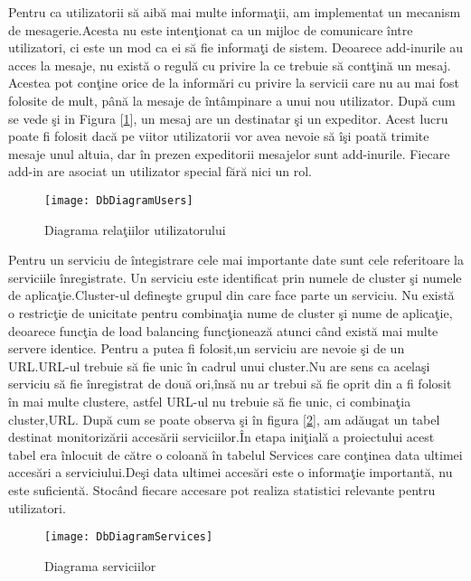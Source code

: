 \documentclass[a4paper,12pt]{report}
\let\oldref\ref
\renewcommand{\ref}[1]{[\oldref{#1}]}
\begin{document}
Pentru ca utilizatorii s\u a aib\u a mai multe informa\c tii, am implementat un mecanism de mesagerie.Acesta nu este 
inten\c tionat ca un mijloc de comunicare \^intre utilizatori, ci este un mod ca ei s\u a fie informa\c ti de sistem.
Deoarece add-inurile au acces la mesaje, nu exist\u a o regul\u a cu privire la ce trebuie s\u a cont\c tin\u a un mesaj.
Acestea pot con\c tine orice de la inform\u ari cu privire la servicii care nu au mai fost folosite de mult, p\^an\u a
la mesaje de \^int\^ampinare a unui nou utilizator. Dup\u a cum se vede \c si in Figura \ref{fig:DbUser}, un mesaj 
are un destinatar \c si un expeditor. Acest lucru poate fi folosit dac\u a pe viitor utilizatorii vor avea nevoie s\u a
 \^i\c si poat\u a trimite mesaje unul altuia, dar \^in prezen expeditorii mesajelor sunt add-inurile.
 Fiecare add-in are asociat un utilizator special f\u ar\u a nici un rol.


\begin{figure}
	\texttt{[image: DbDiagramUsers]}
	\caption{Diagrama rela\c tiilor utilizatorului}
	\label{fig:DbUser}
\end{figure}

Pentru un serviciu de \^integistrare cele mai importante date sunt cele referitoare la serviciile \^inregistrate.
Un serviciu este identificat prin numele de cluster \c si numele de aplica\c tie.Cluster-ul define\c ste grupul
din care face parte un serviciu. Nu exist\u a o restric\c tie de unicitate pentru combina\c tia nume de cluster \c si
nume de aplica\c tie, deoarece func\c tia de load balancing func\c tioneaz\u a atunci c\^and exist\u a mai multe 
servere identice. Pentru a putea fi folosit,un serviciu are nevoie \c si de un URL.URL-ul trebuie s\u a fie unic \^in 
cadrul unui cluster.Nu are sens ca acela\c si serviciu s\u a fie \^inregistrat de dou\u a ori,\^ins\u a nu ar trebui 
s\u a fie oprit din a fi folosit \^in mai multe clustere, astfel URL-ul nu trebuie s\u a fie unic, ci combina\c tia 
cluster,URL. Dup\u a cum se poate observa \c si \^in figura \ref{fig:DbServices}, am ad\u augat un tabel destinat
monitoriz\u arii acces\u arii serviciilor.\^In etapa ini\c tial\u a a proiectului acest tabel era \^inlocuit de 
c\u atre o coloan\u a \^in tabelul Services care con\c tinea data ultimei acces\u ari a serviciului.De\c si 
data ultimei acces\u ari este o informa\c tie important\u a, nu este suficient\u a. Stoc\^and fiecare accesare 
pot realiza statistici relevante pentru utilizatori.

\begin{figure}[!ht]
	\texttt{[image: DbDiagramServices]}
	\caption{Diagrama serviciilor}
	\label{fig:DbServices}
\end{figure}
\end{document}
